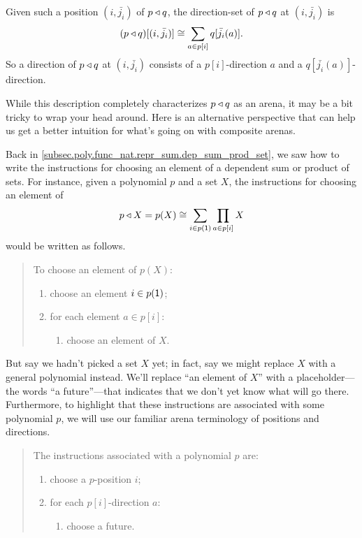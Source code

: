 \documentclass[Book-Poly]{subfiles}
\begin{document}
Given such a position $(i, \bar{j_i})$ of $p \mathbin{\triangleleft} q$, the direction-set of $p \mathbin{\triangleleft} q$ at $(i, \bar{j_i})$ is
\begin{equation} \label{eqn.comp_dir}
    (p \mathbin{\triangleleft} q)[(i, \bar{j_i})] \cong \sum_{a \in p[i]} q[\bar{j_i}(a)].
\end{equation}
So a direction of $p \mathbin{\triangleleft} q$ at $(i, \bar{j_i})$ consists of a $p[i]$-direction $a$ and a $q[\bar{j_i}(a)]$-direction.

While this description completely characterizes $p \mathbin{\triangleleft} q$ as an arena, it may be a bit tricky to wrap your head around.
Here is an alternative perspective that can help us get a better intuition for what's going on with composite arenas.

Back in \cref{subsec.poly.func_nat.repr_sum.dep_sum_prod_set}, we saw how to write the instructions for choosing an element of a dependent sum or product of sets.
For instance, given a polynomial $p$ and a set $X$, the instructions for choosing an element of
\[
    p\mathbin{\triangleleft} X=p(X)\cong\sum_{i\in p(\textsf{1})}\prod_{a\in p[i]}X
\]
would be written as follows.
\begin{quote}
To choose an element of $p(X)$: 
\begin{enumerate}
    \item choose an element $i\in p(\textsf{1})$;
    \item for each element $a\in p[i]$:
    \begin{enumerate}[label*=\arabic*.]
        \item choose an element of $X$.
    \end{enumerate}
\end{enumerate}
\end{quote}
But say we hadn't picked a set $X$ yet; in fact, say we might replace $X$ with a general polynomial instead.
We'll replace ``an element of $X$'' with a placeholder---the words ``a future''---that indicates that we don't yet know what will go there.
Furthermore, to highlight that these instructions are associated with some polynomial $p$, we will use our familiar arena terminology of positions and directions.
\begin{quote}
The instructions associated with a polynomial $p$ are:
\begin{enumerate}
    \item choose a $p$-position $i$;
    \item for each $p[i]$-direction $a$:
    \begin{enumerate}[label*=\arabic*.]
        \item choose a future.
    \end{enumerate}
\end{enumerate}
\end{quote}
\end{document}
